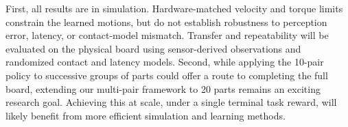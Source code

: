 First, all results are in simulation. Hardware-matched velocity and torque
limits constrain the learned motions, but do not establish robustness to
perception error, latency, or contact-model mismatch. 
Transfer and repeatability
will be evaluated on the physical board using sensor-derived observations and
randomized contact and latency models.
Second, while applying the 10-pair policy to successive groups of parts could offer a route to completing the full board, extending our multi-pair framework to 20 parts remains an exciting research goal. Achieving this at scale, under a single terminal task reward, will likely benefit from more efficient simulation and learning methods.


